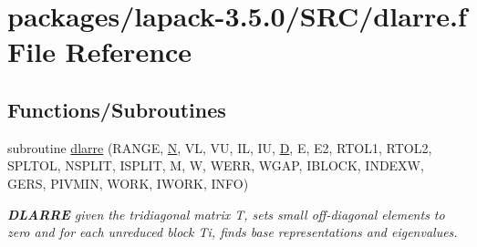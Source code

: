 \hypertarget{dlarre_8f}{}\section{packages/lapack-\/3.5.0/\+S\+R\+C/dlarre.f File Reference}
\label{dlarre_8f}
\subsection*{Functions/\+Subroutines}
\begin{DoxyCompactItemize}
\item 
subroutine \hyperlink{group__auxOTHERauxiliary_gae8358ae1847bb9cfb96b56b6f3ef6386}{dlarre} (R\+A\+N\+G\+E, \hyperlink{polmisc_8c_a0240ac851181b84ac374872dc5434ee4}{N}, V\+L, V\+U, I\+L, I\+U, \hyperlink{odrpack_8h_a7dae6ea403d00f3687f24a874e67d139}{D}, E, E2, R\+T\+O\+L1, R\+T\+O\+L2, S\+P\+L\+T\+O\+L, N\+S\+P\+L\+I\+T, I\+S\+P\+L\+I\+T, M, W, W\+E\+R\+R, W\+G\+A\+P, I\+B\+L\+O\+C\+K, I\+N\+D\+E\+X\+W, G\+E\+R\+S, P\+I\+V\+M\+I\+N, W\+O\+R\+K, I\+W\+O\+R\+K, I\+N\+F\+O)
\begin{DoxyCompactList}\small\item\em {\bfseries D\+L\+A\+R\+R\+E} given the tridiagonal matrix T, sets small off-\/diagonal elements to zero and for each unreduced block Ti, finds base representations and eigenvalues. \end{DoxyCompactList}\end{DoxyCompactItemize}
